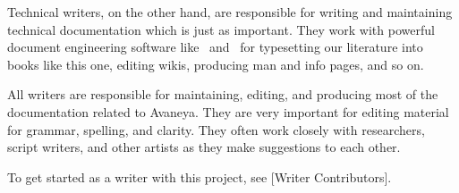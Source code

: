 Technical writers, on the other hand, are responsible for writing and maintaining technical documentation which is just as important. They work with powerful document engineering software like \BIBTEX\ and \CONTEXT\ for typesetting our literature into books like this one, editing wikis, producing man and info pages, and so on.

All writers are responsible for maintaining, editing, and producing most of the documentation related to Avaneya. They are very important for editing material for grammar, spelling, and clarity. They often work closely with researchers, script writers, and other artists as they make suggestions to each other. 

To get started as a writer with this project, see [Writer Contributors].

\StopChapter

